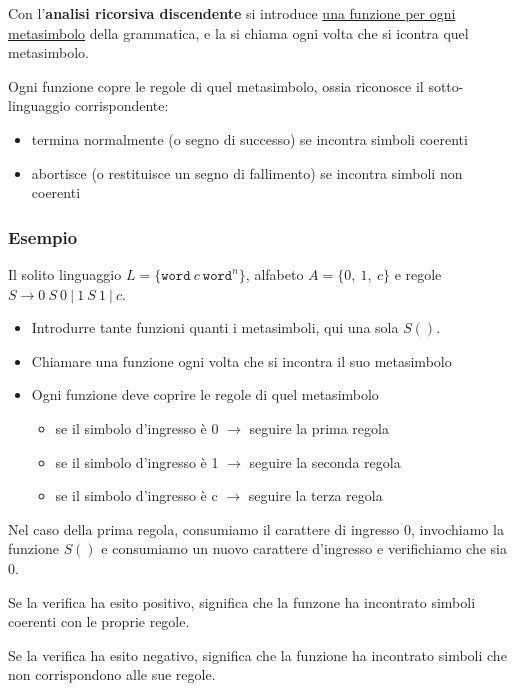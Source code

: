 Con l'\textbf{analisi ricorsiva discendente} si introduce \underline{una funzione per ogni metasimbolo} della grammatica, e la si chiama ogni volta che si icontra quel metasimbolo.

Ogni funzione copre le regole di quel metasimbolo, ossia riconosce il sotto-linguaggio corrispondente:
\begin{itemize}
    \item termina normalmente (o segno di successo) se incontra simboli coerenti
    \item abortisce (o restituisce un segno di fallimento) se incontra simboli non coerenti
\end{itemize}

\subsubsection{Esempio}

Il solito linguaggio $L = \{\texttt{word}\ c\ \texttt{word}^n\}$, alfabeto $A = \{0,\ 1,\ c\}$ e regole $S \rightarrow 0\ S\ 0\ |\ 1\ S\ 1\ |\ c$. 

\begin{itemize}
    \item Introdurre tante funzioni quanti i metasimboli, qui una sola $S()$.
    \item Chiamare una funzione ogni volta che si incontra il suo metasimbolo
    \item Ogni funzione deve coprire le regole di quel metasimbolo
        \begin{itemize}
            \item se il simbolo d'ingresso è 0 $\rightarrow$ seguire la prima regola
            \item se il simbolo d'ingresso è 1 $\rightarrow$ seguire la seconda regola
            \item se il simbolo d'ingresso è c $\rightarrow$ seguire la terza regola
        \end{itemize}
\end{itemize}

Nel caso della prima regola, consumiamo il carattere di ingresso 0, invochiamo la funzione $S()$ e consumiamo un nuovo carattere d'ingresso e verifichiamo che sia 0.

Se la verifica ha esito positivo, significa che la funzone ha incontrato simboli coerenti con le proprie regole.

Se la verifica ha esito negativo, significa che la funzione ha incontrato simboli che non corrispondono alle sue regole.

